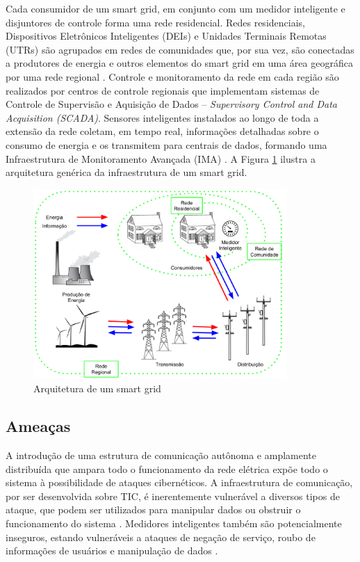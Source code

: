 \documentclass[cic,tc]{iiufrgs}
\begin{document}
Cada consumidor de um smart grid, em conjunto com um medidor inteligente e disjuntores de controle forma uma rede residencial. Redes residenciais, Dispositivos Eletrônicos Inteligentes (DEIs) e Unidades Terminais Remotas (UTRs) são agrupados em redes de comunidades que, por sua vez, são conectadas a produtores de energia e outros elementos do smart grid em uma área geográfica por uma rede regional \cite{li2012securing}. Controle e monitoramento da rede em cada região são realizados por centros de controle regionais que implementam sistemas de Controle de Supervisão e Aquisição de Dados – \textit{Supervisory Control and Data Acquisition (SCADA)}. Sensores inteligentes instalados ao longo de toda a extensão da rede coletam, em tempo real, informações detalhadas sobre o consumo de energia e os transmitem para centrais de dados, formando uma Infraestrutura de Monitoramento Avançada (IMA) \cite{2013survey}. A Figura \ref{fig:sgarchitecture} ilustra a arquitetura genérica da infraestrutura de um smart grid.

\begin{figure}[h]
   \caption{Arquitetura de um smart grid}
   \begin{center}
       \includegraphics[width=26em]{smart_grid_arch}
   \end{center}
   \label{fig:sgarchitecture}
\end{figure}


\subsection{Ameaças}
\label{subsecthreats}
A introdução de uma estrutura de comunicação autônoma e amplamente distribuída que ampara todo o funcionamento da rede elétrica expõe todo o sistema à possibilidade de ataques cibernéticos. A infraestrutura de comunicação, por ser desenvolvida sobre TIC, é inerentemente vulnerável a diversos tipos de ataque, que podem ser utilizados para manipular dados ou obstruir o funcionamento do sistema \cite{pin2012smart}. Medidores inteligentes também são potencialmente inseguros, estando vulneráveis a ataques de negação de serviço, roubo de informações de usuários e manipulação de dados \cite{ashford2011smartmeter}.
\end{document}
